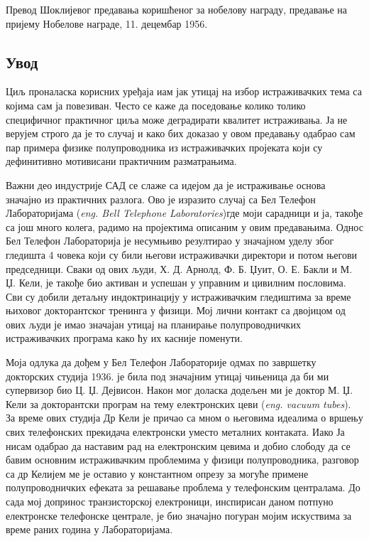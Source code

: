 \documentclass{article}
\begin{document}
Превод Шоклијевог предавања коришћеног за нобелову награду, предавање на пријему Нобелове награде, 11. децембар 1956.

\subsection{Увод}

Циљ проналаска корисних уређаја иам јак утицај на избор истраживачких тема са којима сам ја повезиван. Често се каже да поседовање колико толико специфичног практичног циља може деградирати квалитет истраживања. Ја не верујем строго да је то случај и како бих доказао у овом предавању одабрао сам пар примера физике полупроводника из истраживачких пројеката који су дефинитивно мотивисани практичним разматрањима.

Важни део индустрије САД се слаже са идејом да је истраживање основа значајно из практичних разлога. Ово је изразито случај са Бел Телефон Лабораторијама (\textit{eng. Bell Telephone Laboratories})где моји сарадници и ја, такође са још много колега, радимо на пројектима описаним у овим предавањима. Однос Бел Телефон Лабораторија је несумњиво резултирао у значајном уделу због гледишта 4 човека који су били његови истраживачки директори и потом његови председници. Сваки од ових људи, Х. Д. Арнолд, Ф. Б. Џуит, О. Е. Бакли и М. Џ. Кели, је такође био активан и успешан у управним и цивилним пословима. Сви су добили детаљну индоктринацију у истраживачким гледиштима за време њиховог докторантског тренинга у физици. Мој лични контакт са двојицом од ових људи је имао значајан утицај на планирање полупроводничких истраживачких програма како ћу их касније поменути.

Моја одлука да дођем у Бел Телефон Лабораторије одмах по завршетку докторских студија 1936. је била под значајним утицај чињеница да би ми супервизор био Ц. Џ. Дејвисон. Након мог доласка додељен ми је доктор М. Џ. Кели за докторантски програм на тему електронских цеви (\textit{eng. vacuum tubes}). За време ових студија Др Кели је причао са мном о његовима идеалима о вршењу свих телефонских прекидача електронски уместо металних контаката. Иако Ја нисам одабрао да наставим рад на електронским цевима и добио слободу да се бавим основним истраживачким проблемима у физици полупроводника, разговор са др Келијем ме је оставио у константном опрезу за могуће примене полупроводничких ефеката за решавање проблема у телефонским централама. До сада мој допринос транзисторској електроници, инспирисан даном потпуно електронске телефонске централе, је био значајно погуран мојим искуствима за време раних година у Лабораторијама.
\end{document}
